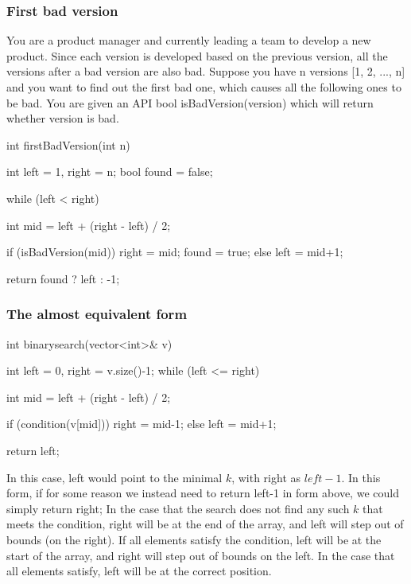 \documentclass{report}
\begin{document}
   \bigbreak \noindent 
   \subsubsection{First bad version}
   \bigbreak \noindent 
   You are a product manager and currently leading a team to develop a new product. Since each version is developed based on the previous version, all the versions after a bad version are also bad. Suppose you have n versions [1, 2, ..., n] and you want to find out the first bad one, which causes all the following ones to be bad. You are given an API bool isBadVersion(version) which will return whether version is bad.
   \bigbreak \noindent 
   \begin{cppcode}
       int firstBadVersion(int n) {
           int left = 1, right = n;
           bool found = false;

           while (left < right) {
               int mid = left + (right - left) / 2;

               if (isBadVersion(mid)) {
                   right = mid;
                   found = true;
               } else {
                   left = mid+1;
               }
           }
           return found ? left : -1;
       }
   \end{cppcode}

   \bigbreak \noindent 
   \subsubsection{The almost equivalent form}
   \bigbreak \noindent 
   \begin{cppcode}
       int binarysearch(vector<int>& v) {
           int left = 0, right = v.size()-1;
           while (left <= right) {
               int mid = left + (right - left) / 2;

               if (condition(v[mid])){
                   right = mid-1;
               } else {
                   left = mid+1;
               }
           }
           return left;
       }
   \end{cppcode}
   \bigbreak \noindent 
   In this case, left would point to the minimal $k$, with right as $left-1$. In this form, if for some reason we instead need to return left-1 in form above, we could simply return right;
   \bigbreak \noindent 
   In the case that the search does not find any such $k$ that meets the condition, right will be at the end of the array, and left will step out of bounds (on the right). If all elements satisfy the condition, left will be at the start of the array, and right will step out of bounds on the left.
   \bigbreak \noindent 
   In the case that all elements satisfy, left will be at the correct position.
\end{document}
